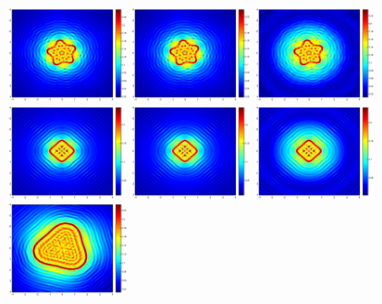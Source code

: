 \begin{figure}
	\includegraphics[width=0.28\textwidth]{./Img/graphic_phase/5-leaf_r_10_k_4_vector.eps}
	\includegraphics[width=0.28\textwidth]{./Img/graphic_phase/5-leaf_r_10_k_4_scalar.eps}
	\includegraphics[width=0.28\textwidth]{./Img/graphic_phase/5-leaf_r_10_k_4_phaseless_n_512_bias_100.eps}
	\includegraphics[width=0.28\textwidth]{./Img/graphic_phase/rectangle_r_10_k_4_vector.eps}
	\includegraphics[width=0.28\textwidth]{./Img/graphic_phase/rectangle_r_10_k_4_scalar.eps}
	\includegraphics[width=0.28\textwidth]{./Img/graphic_phase/rectangle_r_10_k_4_phaseless_n_512_bias_100.eps}
	\includegraphics[width=0.28\textwidth]{./Img/graphic_phase/pear_r_10_k_4_vector.eps}

\end{figure}
